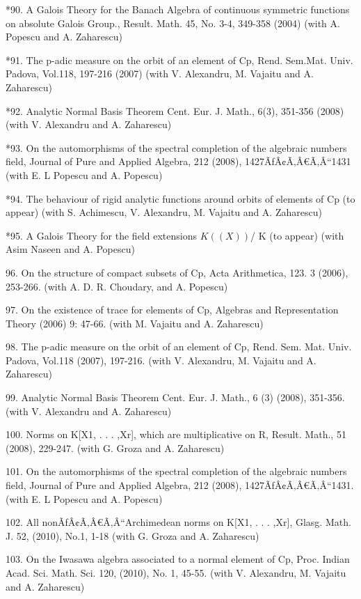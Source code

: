\documentclass[12pt]{article}
\theoremstyle{plain}
\theoremstyle{definition}
\numberwithin{equation}{section}
\begin{document}
*90.    A Galois Theory for the Banach Algebra of continuous symmetric functions on absolute Galois Group., Result. Math. 45, No. 3-4, 349-358 (2004) (with A. Popescu and A. Zaharescu) 

*91.    The p-adic measure on the orbit of an element of Cp, Rend. Sem.Mat. Univ. Padova, Vol.118, 197-216 (2007)  (with V. Alexandru, M. Vajaitu and A. Zaharescu) 

*92.    Analytic Normal Basis Theorem Cent. Eur. J. Math., 6(3), 351-356 (2008) (with V. Alexandru and A. Zaharescu)

*93.    On the automorphisms of the spectral completion of the algebraic numbers field,  Journal of Pure and Applied Algebra, 212 (2008), 1427ÃƒÂ¢Ã‚Â€Ã‚Â“1431 (with E. L Popescu  and A. Popescu)

*94.    The behaviour of rigid analytic functions around orbits of elements of Cp (to appear) (with S. Achimescu, V. Alexandru, M. Vajaitu and A. Zaharescu)

*95.    A Galois Theory for the field extensions $K((X))$/ K (to appear) (with Asim Naseen and A. Popescu)


96.     On the structure of compact subsets of Cp, Acta Arithmetica, 123. 3 (2006), 253-266. (with A. D. R. Choudary, and A. Popescu) 

97.     On the existence of trace for elements of Cp, Algebras and Representation Theory (2006) 9: 47-66. (with M. Vajaitu and A. Zaharescu) 

98.     The p-adic measure on the orbit of an element of Cp, Rend. Sem. Mat. Univ. Padova, Vol.118 (2007), 197-216. (with V. Alexandru, M. Vajaitu and A. Zaharescu) 

99.     Analytic Normal Basis Theorem Cent. Eur. J. Math., 6 (3) (2008), 351-356. (with V. Alexandru and A. Zaharescu) 

100.    Norms on K[X1, . . . ,Xr], which are multiplicative on R, Result. Math., 51 (2008), 229-247.  (with G. Groza and A. Zaharescu) 

101.    On the automorphisms of the spectral completion of the algebraic numbers field,  Journal of Pure and Applied Algebra, 212 (2008), 1427ÃƒÂ¢Ã‚Â€Ã‚Â“1431. (with E. L Popescu and A. Popescu) 

102.    All nonÃƒÂ¢Ã‚Â€Ã‚Â“Archimedean norms on K[X1, . . . ,Xr],  Glasg. Math. J. 52, (2010), No.1, 1-18 (with G. Groza and A. Zaharescu) 

103.    On the Iwasawa algebra associated to a normal element of Cp, Proc. Indian Acad. Sci. Math. Sci. 120, (2010), No. 1, 45-55. (with V. Alexandru, M. Vajaitu and A. Zaharescu) 
\end{document}
